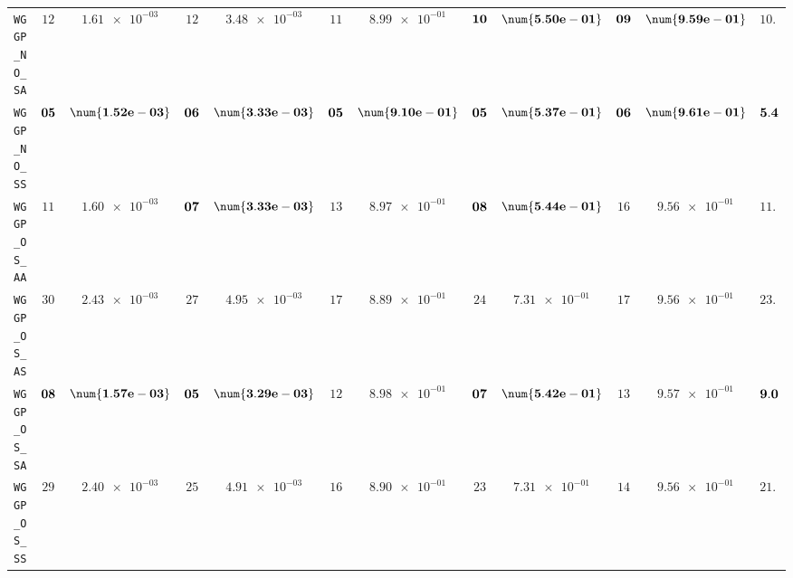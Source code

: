 \begin{xltabular}{\textwidth}{l||cC|cC|cC|cC|cC||c}
	\texttt{WGGP\_NO\_SA} & $ 12$ & $ \num{1.61e-03}$ & $ 12$ & $ \num{3.48e-03}$ & $ 11$ & $ \num{8.99e-01}$ & $\bf 10$ & $\bf \num{5.50e-01}$ & $\bf 09$ & $\bf \num{9.59e-01}$ & $ 10.8$  \\
	\texttt{WGGP\_NO\_SS} & $\bf 05$ & $\bf \num{1.52e-03}$ & $\bf 06$ & $\bf \num{3.33e-03}$ & $\bf 05$ & $\bf \num{9.10e-01}$ & $\bf 05$ & $\bf \num{5.37e-01}$ & $\bf 06$ & $\bf \num{9.61e-01}$ & $\bf 5.4$  \\
	\texttt{WGGP\_OS\_AA} & $ 11$ & $ \num{1.60e-03}$ & $\bf 07$ & $\bf \num{3.33e-03}$ & $ 13$ & $ \num{8.97e-01}$ & $\bf 08$ & $\bf \num{5.44e-01}$ & $ 16$ & $ \num{9.56e-01}$ & $ 11.0$  \\
	\texttt{WGGP\_OS\_AS} & $ 30$ & $ \num{2.43e-03}$ & $ 27$ & $ \num{4.95e-03}$ & $ 17$ & $ \num{8.89e-01}$ & $ 24$ & $ \num{7.31e-01}$ & $ 17$ & $ \num{9.56e-01}$ & $ 23.0$  \\
	\texttt{WGGP\_OS\_SA} & $\bf 08$ & $\bf \num{1.57e-03}$ & $\bf 05$ & $\bf \num{3.29e-03}$ & $ 12$ & $ \num{8.98e-01}$ & $\bf 07$ & $\bf \num{5.42e-01}$ & $ 13$ & $ \num{9.57e-01}$ & $\bf 9.0$  \\
	\texttt{WGGP\_OS\_SS} & $ 29$ & $ \num{2.40e-03}$ & $ 25$ & $ \num{4.91e-03}$ & $ 16$ & $ \num{8.90e-01}$ & $ 23$ & $ \num{7.31e-01}$ & $ 14$ & $ \num{9.56e-01}$ & $ 21.4$  \\

\end{xltabular}
